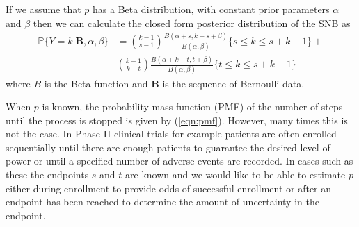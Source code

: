\documentclass[12pt]{article}         %
\begin{document}

If we assume that $p$ has a Beta distribution, with constant prior parameters $\alpha$ and $\beta$ then we can calculate the closed form posterior 
distribution of the SNB as
\begin{align}
\mathbb{P} \{Y = k | \mathbf{B}, \alpha, \beta \} &= {k-1 \choose s-1} \frac{B\left(\alpha+s, k-s+\beta \right)}{B(\alpha, \beta)} \{s \leq k \leq s+k-1\} + \nonumber \\
& {k-1 \choose k-t} \frac{B\left(\alpha + k - t, t+\beta\right)}{B(\alpha, \beta)} \{t \leq k \leq s+k-1\}
\end{align}
where $B$ is the Beta function and $\mathbf{B}$ is the sequence of Bernoulli data.

When $p$ is known, the probability mass function (PMF) of the number of steps 
until the process is stopped is given by (\ref{eqn:pmf}). However, many times 
this is not the case. In Phase II clinical trials for example patients are 
often enrolled sequentially until there are enough patients to guarantee the 
desired level of power or until a specified number of adverse events are 
recorded. In cases such as these the endpoints $s$ and $t$ are known and we 
would like to be able to estimate $p$ either during enrollment to provide odds 
of successful enrollment or after an endpoint has been reached to determine 
the amount of uncertainty in the endpoint. 
\end{document}
